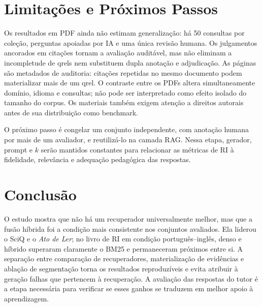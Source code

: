 \documentclass[12pt]{article}
\begin{document}
\section{Limitações e Próximos Passos}

Os resultados em PDF ainda não estimam generalização: há 50 consultas por
coleção, perguntas apoiadas por IA e uma única revisão humana. Os julgamentos
ancorados em citações tornam a avaliação auditável, mas não eliminam a
incompletude de qrels nem substituem dupla anotação e adjudicação. As páginas
são metadados de auditoria: citações repetidas no mesmo documento podem
materializar mais de um qrel. O contraste entre os PDFs altera simultaneamente
domínio, idioma e consultas;
não pode ser interpretado como efeito isolado do tamanho do corpus. Os materiais
também exigem atenção a direitos autorais antes de sua distribuição como
benchmark.

O próximo passo é congelar um conjunto independente, com anotação humana por
mais de um avaliador, e reutilizá-lo na camada RAG. Nessa etapa, gerador,
prompt e $k$ serão mantidos constantes para relacionar as métricas de RI à
fidelidade, relevância e adequação pedagógica das respostas.

\section{Conclusão}

O estudo mostra que não há um recuperador universalmente melhor, mas que a
fusão híbrida foi a condição mais consistente nos conjuntos avaliados. Ela
liderou o SciQ e o \textit{Ato de Ler}; no livro de RI em condição
português--inglês, denso e híbrido superaram claramente o BM25 e permaneceram
próximos entre si. A separação entre comparação de recuperadores, materialização
de evidências e ablação de segmentação torna os resultados reproduzíveis e
evita atribuir à geração falhas que pertencem à recuperação. A avaliação das
respostas do tutor é a etapa necessária para verificar se esses ganhos se
traduzem em melhor apoio à aprendizagem.
\end{document}
